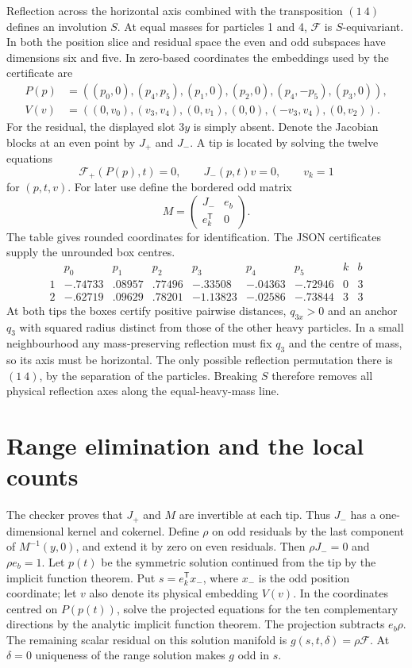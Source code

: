 \documentclass[11pt]{article}
\newcommand{\F}{\mathcal F}
\begin{document}
Reflection across the horizontal axis combined with the transposition $(1\ 4)$
defines an involution $S$. At equal masses for particles 1 and 4, $\F$ is
$S$-equivariant. In both the position slice and residual space the even and odd
subspaces have dimensions six and five. In zero-based coordinates the
embeddings used by the certificate are
\begin{align*}
 P(p)&=((p_0,0),(p_4,p_5),(p_1,0),(p_2,0),(p_4,-p_5),(p_3,0)),\\
 V(v)&=((0,v_0),(v_3,v_4),(0,v_1),(0,0),(-v_3,v_4),(0,v_2)).
\end{align*}
For the residual, the displayed slot $3y$ is simply absent. Denote
the Jacobian blocks at an even point by $J_+$ and $J_-$. A tip is located
by solving the twelve equations
\[
 \F_+(P(p),t)=0,\qquad J_-(p,t)v=0,\qquad v_k=1                 \tag{1}
\]
for $(p,t,v)$. For later use define the bordered odd matrix
\[
 M=\begin{pmatrix}J_-&e_b\\ e_k^{\mathsf T}&0\end{pmatrix}.
\]
The table gives rounded coordinates for identification. The JSON certificates
supply the unrounded box centres.
\[
\begin{array}{c|rrrrrr|cc}
 &p_0&p_1&p_2&p_3&p_4&p_5&k&b\\ \hline
 1&-.74733&.08957&.77496&-.33508&-.04363&-.72946&0&3\\
 2&-.62719&.09629&.78201&-1.13823&-.02586&-.73844&3&3
\end{array}
\]
At both tips the boxes certify positive pairwise distances, $q_{3x}>0$ and
an anchor $q_3$ with squared radius distinct from those of the other heavy
particles. In a small neighbourhood any mass-preserving reflection must
fix $q_3$ and the centre of mass, so its axis must be horizontal. The only
possible reflection permutation there is $(1\ 4)$, by the separation of
the particles. Breaking $S$ therefore removes all physical reflection axes
along the equal-heavy-mass line.

\newpage
\section{Range elimination and the local counts}
The checker proves that $J_+$ and $M$ are invertible at each tip. Thus $J_-$
has a one-dimensional kernel and cokernel. Define $\rho$ on odd residuals
by the last component of $M^{-1}(y,0)$, and extend it by zero on even
residuals. Then $\rho J_-=0$ and $\rho e_b=1$. Let $p(t)$ be the symmetric
solution continued from the tip by the implicit function theorem. Put
$s=e_k^{\mathsf T}x_-$, where $x_-$ is the odd position coordinate;
let $v$ also denote its physical embedding $V(v)$. In the coordinates
centred on $P(p(t))$, solve the projected equations for the ten
complementary directions by the analytic implicit function theorem. The
projection subtracts $e_b\rho$. The remaining scalar residual on this
solution manifold is $g(s,t,\delta)=\rho\F$. At $\delta=0$ uniqueness of
the range solution makes $g$ odd in $s$.
\end{document}
